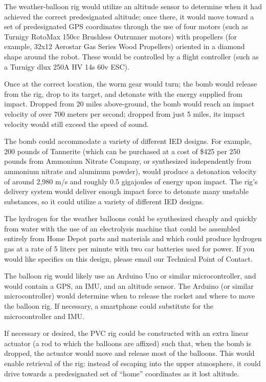 \documentclass[12pt]{article}
\begin{document}
The weather-balloon rig would utilize an altitude sensor to determine when
it had achieved the correct predesignated altitude; once there, it would move
toward a set of predesignated GPS coordinates through the use of four motors
(such as Turnigy RotoMax 150cc Brushless Outrunner motors) with propellers
(for example, 32x12 Aerostar Gas Series Wood Propellers) oriented in a diamond
shape around the robot. These would be controlled by a flight controller
(such as a Turnigy dlux 250A HV 14s 60v ESC).

Once at the correct location, the worm gear would turn; the bomb would release
from the rig, drop to its target, and detonate with the energy supplied from
impact. Dropped from 20 miles above-ground, the bomb would reach an impact
velocity of over 700 meters per second; dropped from just 5 miles, its impact
velocity would still exceed the speed of sound.

The bomb could accommodate a variety of different IED designs. For example, 200
pounds of Tannerite (which can be purchased at a cost of \$425 per 250 pounds from
Ammonium Nitrate Company, or synthesized independently from ammonium nitrate and
aluminum powder), would produce a detonation velocity of around 2,980 m/s and
roughly 0.5 gigajoules of energy upon impact. The rig's delivery system would
deliver enough impact force to detonate many unstable substances, so it could
utilize a variety of different IED designs.

The hydrogen for the weather balloons could be synthesized cheaply and quickly
from water with the use of an electrolysis machine that could be assembled
entirely from Home Depot parts and materials and which could produce hydrogen
gas at a rate of 5 liters per minute with two car batteries used for power.
If you would like specifics on this design, please email our Technical Point of Contact.

The balloon rig would likely use an Arduino Uno or similar microcontroller,
and would contain a GPS, an IMU, and an altitude sensor. The  Arduino (or
similar microcontroller) would determine when to release the rocket and where
to move the balloon rig. If necessary, a smartphone could substitute for the
microcontroller and IMU.

If necessary or desired, the PVC rig could be constructed with an extra linear
actuator (a rod to which the balloons are affixed) such that, when the bomb is
dropped, the actuator would move and release most of the balloons. This would
enable retrieval of the rig: instead of escaping into the upper atmosphere, it
could drive towards a predesignated set of ``home'' coordinates as it lost altitude.
\end{document}
